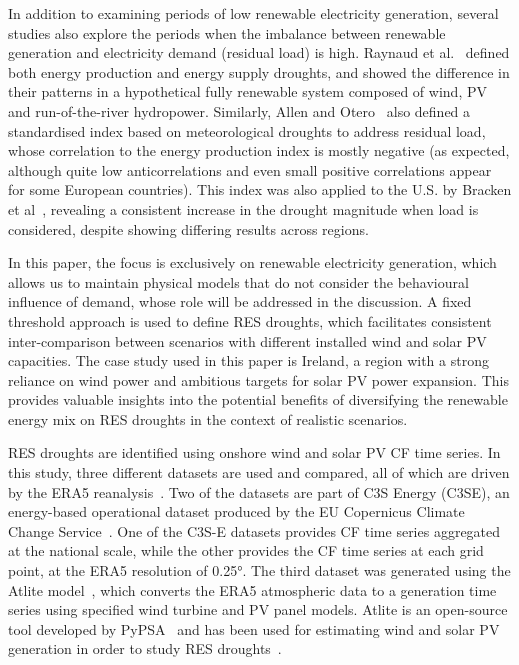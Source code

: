 \documentclass[preprint, 12pt]{elsarticle}
\begin{document}
In addition to examining periods of low renewable electricity generation, several studies also explore the periods when the imbalance between renewable generation and electricity demand (residual load) is high. Raynaud et al.~\citep{raynaud2018drought} defined both energy production and energy supply droughts, and showed the difference in their patterns in a hypothetical fully renewable system composed of wind, PV and run-of-the-river hydropower. Similarly, Allen and Otero~\citep{allen2023drought} also defined a standardised index based on meteorological droughts to address residual load, whose correlation to the energy production index is mostly negative (as expected, although quite low anticorrelations and even small positive correlations appear for some European countries). This index was also applied to the U.S. by Bracken et al~\citep{bracken2024drought}, revealing a consistent increase in the drought magnitude when load is considered, despite showing differing results across regions.

In this paper, the focus is exclusively on renewable electricity generation, which allows us to maintain physical models that do not consider the behavioural influence of demand, whose role will be addressed in the discussion. A fixed threshold approach is used to define RES droughts, which facilitates consistent inter-comparison between scenarios with different installed wind and solar PV capacities. The case study used in this paper is Ireland, a region with a strong reliance on wind power and ambitious targets for solar PV power expansion. This provides valuable insights into the potential benefits of diversifying the renewable energy mix on RES droughts in the context of realistic scenarios.

RES droughts are identified using onshore wind and solar PV CF time series. In this study, three different datasets are used and compared, all of which are driven by the ERA5 reanalysis~\citep{hersbach2020era5}. Two of the datasets are part of C3S Energy (C3SE), an energy-based operational dataset produced by the EU Copernicus Climate Change Service~\citep{dubus2023energy}. One of the C3S-E datasets provides CF time series aggregated at the national scale, while the other provides the CF time series at each grid point, at the ERA5 resolution of 0.25°. The third dataset was generated using the Atlite model~\citep{hofman2021atlite}, which converts the ERA5 atmospheric data to a generation time series using specified wind turbine and PV panel models. Atlite is an open-source tool developed by PyPSA~\citep{hofman2021atlite} and has been used for estimating wind and solar PV generation in order to study RES droughts~\citep{mockert2023drought}.
\end{document}
